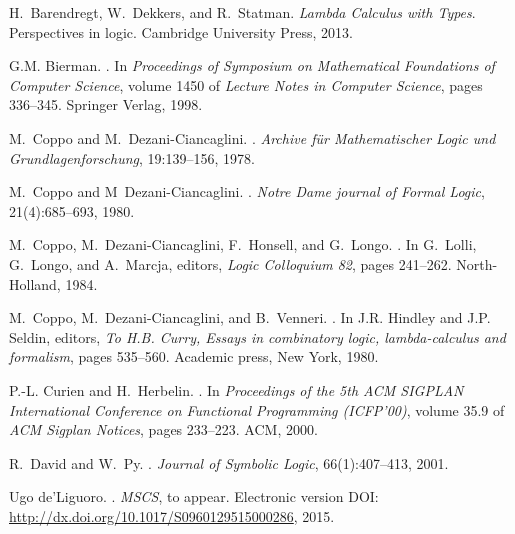 \documentclass{lmcs}
\begin{document}
\begin{thebibliography}{10}
H.~Barendregt, W.~Dekkers, and R.~Statman.
\newblock \emph{Lambda Calculus with Types}.
\newblock Perspectives in logic. Cambridge University Press, 2013.

G.M. Bierman.
.
\newblock In \emph{Proceedings of Symposium on Mathematical Foundations of
 Computer Science}, volume 1450 of \emph{Lecture Notes in Computer Science},
 pages 336--345. Springer Verlag, 1998.

M.~Coppo and M.~Dezani{-}Ciancaglini.
.
\newblock \emph{Archive f\"ur Mathematischer Logic und Grundlagenforschung},
 19:139--156, 1978.

M.~Coppo and M~{Dezani-Ciancaglini}.
.
\newblock \emph{Notre Dame journal of Formal Logic}, 21(4):685--693, 1980.

M.~Coppo, M.~{Dezani-Ciancaglini}, F.~Honsell, and G.~Longo.
.
\newblock In G.~Lolli, G.~Longo, and A.~Marcja, editors, \emph{Logic Colloquium
 82}, pages 241--262. North-Holland, 1984.

M.~Coppo, M.~{Dezani-Ciancaglini}, and B.~Venneri.
.
\newblock In J.R. Hindley and J.P. Seldin, editors, \emph{To H.B. Curry, Essays
 in combinatory logic, lambda-calculus and formalism}, pages 535--560.
 Academic press, New York, 1980.

P.-L. Curien and H.~Herbelin.
.
\newblock In \emph{Proceedings of the 5th ACM SIGPLAN International Conference
 on Functional Programming (ICFP'00)}, volume 35.9 of \emph{ACM Sigplan
 Notices}, pages 233--223. ACM, 2000.

R.~David and W.~Py.
.
\newblock \emph{Journal of Symbolic Logic}, 66(1):407--413, 2001.

Ugo de'Liguoro.
.
\newblock \emph{MSCS},
\newblock to appear. Electronic version DOI: \url{http://dx.doi.org/10.1017/S0960129515000286},
2015.


\end{thebibliography}
\end{document}
